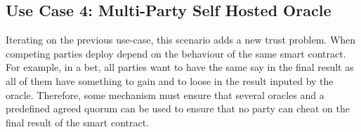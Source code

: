 \subsection{Use Case 4: Multi-Party Self Hosted Oracle}

Iterating on the previous use-case, this scenario adds a new trust problem. When competing parties deploy depend on the behaviour of the same smart contract. For example, in a bet, all parties want to have the same say in the final result as all of them have something to gain and to loose in the result inputed by the oracle. Therefore, some mechanism must ensure that several oracles and a predefined agreed quorum can be used to ensure that no party can cheat on the final result of the smart contract.